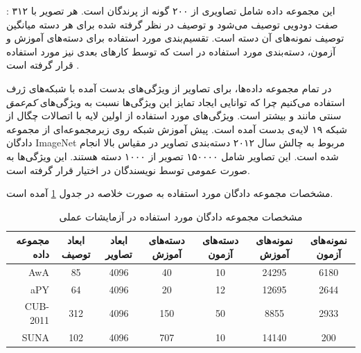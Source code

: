 \textbf{} \cite{cub}:
این مجموعه داده شامل تصاویری از ۲۰۰ گونه از پرندگان است. هر تصویر با ۳۱۲ صفت دودویی توصیف می‌شود و توصیف در نظر گرفته شده برای هر دسته میانگین توصیف نمونه‌های آن دسته است. تقسیم‌بندی مورد استفاده برای دسته‌های آموزش و آزمون، دسته‌بندی مورد استفاده در \cite{akata13} است که توسط کارهای بعدی نیز مورد استفاده قرار گرفته است
\cite{sse, Akata2015, Reed2016}.


در تمام مجموعه داده‌ها، برای تصاویر از ویژگی‌های بدست آمده با شبکه‌های ژرف استفاده می‌کنیم چرا که توانایی ایجاد تمایز این ویژگی‌ها نسبت به ویژگی‌های
\textit{کم‌عمق}
سنتی مانند   و   بیشتر است.
ویژگی‌های مورد استفاده از  اولین لایه با اتصالات چگال از شبکه ۱۹ لایه‌ی  \cite{vgg} بدست آمده است. پیش آموزش شبکه  روی زیرمجموعه‌ای از
مجموعه دادگان ImageNet
\cite{imagenet}
مربوط به چالش سال ۲۰۱۲ دسته‌بندی تصاویر در مقیاس بالا
 \cite{ILSVRC15} انجام شده است.
 این تصاویر شامل ۱۵۰۰۰۰ تصویر از ۱۰۰۰ دسته هستند.
 این ویژگی‌ها به صورت عمومی توسط نویسندگان
\cite{sse}
در اختیار قرار گرفته است.

مشخصات مجموعه دادگان مورد استفاده به صورت خلاصه در جدول \ref{tab:datasets} آمده است.
\begin{center}

\begin{table}[ht]
\centering
\caption{مشخصات مجموعه دادگان مورد استفاده در آزمایشات عملی}
\vspace{2mm}
\label{tab:datasets}
\begin{tabular}{|r|c|c|c|c|c|c|}
\hline
 مجموعه داده & ابعاد توصیف‌ & ابعاد تصاویر &  دسته‌های آموزش & دسته‌های آزمون &  نمونه‌های آموزش &  نمونه‌های آزمون \\
\hline
AwA
& 85 & 4096 & 40 & 10 & 24295 & 6180 \\\hline
 aPY
& 64 & 4096 & 20 & 12 & 12695 & 2644 \\\hline
CUB-2011
& 312 & 4096 & 150 & 50 & 8855 & 2933 \\ \hline
 SUNA
& 102 & 4096 & 707 & 10 & 14140 & 200 \\
\hline
\end{tabular}
\end{table}
\end{center}
%
